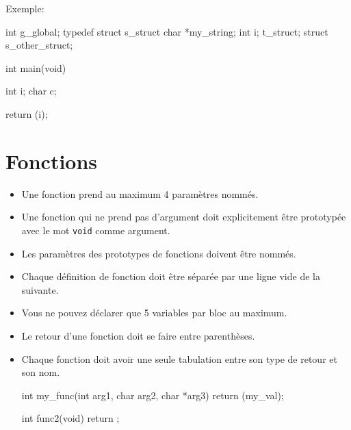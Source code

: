 \documentclass{42-fr}
\begin{document}
            Exemple:
            \begin{42ccode}
int             g_global;
typedef struct  s_struct
{
    char    *my_string;
    int     i;
}               t_struct;
struct          s_other_struct;

int     main(void)
{
    int     i;
    char    c;

    return (i);
}
            \end{42ccode}
            \newpage

    \section{Fonctions}

        \begin{itemize}

            \item Une fonction prend au maximum 4 paramètres nommés.

            \item Une fonction qui ne prend pas d’argument doit explicitement être prototypée 
                avec le mot \texttt{void} comme argument.

            \item Les paramètres des prototypes de fonctions doivent être nommés.

            \item Chaque définition de fonction doit être séparée par une ligne vide de la suivante.

            \item Vous ne pouvez déclarer que 5 variables par bloc au maximum.

            \item Le retour d’une fonction doit se faire entre parenthèses.

            \item Chaque fonction doit avoir une seule tabulation entre son type
                de retour et son nom.

            \begin{42ccode}
int my_func(int arg1, char arg2, char *arg3)
{
    return (my_val);
}

int func2(void)
{
    return ;
}
            \end{42ccode}

        \end{itemize}
        \newpage
\end{document}
